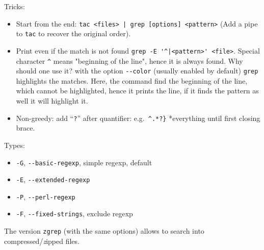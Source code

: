 \documentclass[a4paper,12pt,%
              final%
              ]{article}
\begin{document}
Tricks:
\begin{itemize}
  \item Start from the end: \verb!tac <files> | grep [options] <pattern>! (Add a pipe to \texttt{tac} to recover the original order).
  \item Print even if the match is not found \verb!grep -E '^|<pattern>' <file>!. Special character \verb|^| means "beginning of the line", hence it is always found. Why should one use it? with the option \verb|--color| (usually enabled by default) \verb|grep| highlights the matches. Here, the command find the beginning of the line, which cannot be highlighted, hence it prints the line, if it finds the pattern as well it will highlight it.
  \item Non-greedy: add ``\texttt{?}'' after quantifier: e.g.~\verb|^.*?}| *everything until first closing brace.
\end{itemize}

Types:
\begin{itemize}
  \item \texttt{-G}, \verb|--basic-regexp|, simple regexp, default
  \item \texttt{-E}, \verb|--extended-regexp|
  \item \texttt{-P}, \verb|--perl-regexp|
  \item \texttt{-F}, \verb|--fixed-strings|, exclude regexp
\end{itemize}

The version \texttt{zgrep} (with the same options) allows to search into compressed/\emph{z}ipped files.

\end{document}
